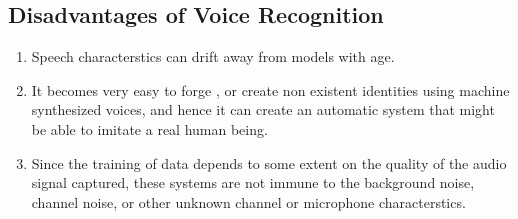 \subsection{Disadvantages of Voice Recognition}

\begin{enumerate}
  \item Speech characterstics can drift away from models with age.
  \item It becomes very easy to forge , or create non existent identities using machine synthesized voices, and  hence it can create an automatic system that might be able to imitate a real human being.
\item Since the training of data depends to some extent on the quality of the audio signal captured, these systems are not immune to the background noise, channel noise, or other unknown  channel or microphone characterstics.
\end{enumerate}
